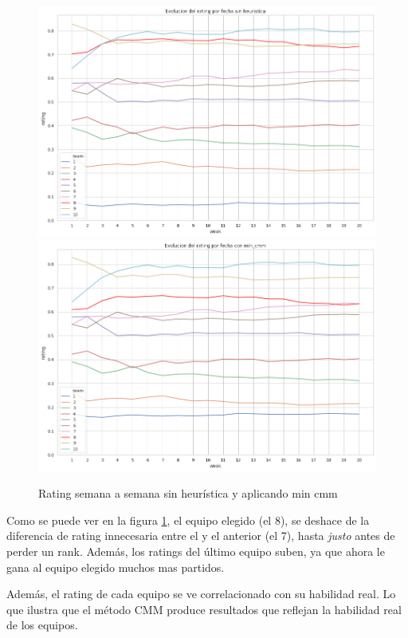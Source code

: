 \documentclass[a4paper]{article}
\begin{document}
\begin{figure}[H]
    \begin{center}
        \includegraphics[scale=0.45]{img/heur/evol-sin-heuristica.png}
        \includegraphics[scale=0.45]{img/heur/evol-min-cmm.png}
        \caption{Rating semana a semana sin heurística y aplicando min cmm}
        \label{heur-evol}
    \end{center}
\end{figure}

Como se puede ver en la figura \ref{heur-evol}, el equipo elegido (el 8), se deshace de la diferencia de rating innecesaria entre el y el anterior (el 7), hasta \textit{justo} antes de perder un rank. Además, los ratings del último equipo suben, ya que ahora le gana al equipo elegido muchos mas partidos.

Además, el rating de cada equipo se ve correlacionado con su habilidad real. Lo que ilustra que el método CMM produce resultados que reflejan la habilidad real de los equipos.
\end{document}
